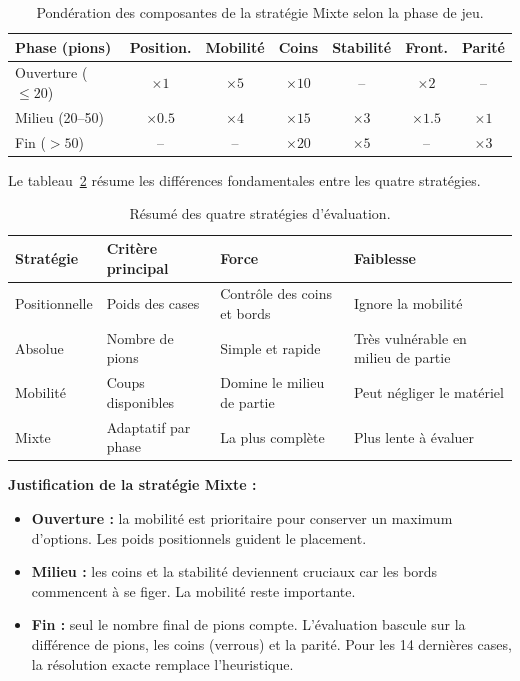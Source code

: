 \documentclass[12pt, a4paper]{article}
\begin{document}
\begin{table}[H]
\centering
\caption{Pondération des composantes de la stratégie Mixte selon la phase de jeu.}
\label{tab:phases}
\begin{tabular}{@{} l c c c c c c @{}}
\toprule
\textbf{Phase (pions)} & \textbf{Position.} & \textbf{Mobilité} & \textbf{Coins} & \textbf{Stabilité} & \textbf{Front.} & \textbf{Parité} \\
\midrule
Ouverture ($\leq 20$)  & $\times 1$   & $\times 5$   & $\times 10$  & --           & $\times 2$   & -- \\
Milieu (20--50)         & $\times 0.5$ & $\times 4$   & $\times 15$  & $\times 3$   & $\times 1.5$ & $\times 1$ \\
Fin ($> 50$)            & --           & --            & $\times 20$  & $\times 5$   & --            & $\times 3$ \\
\bottomrule
\end{tabular}
\end{table}

Le tableau~\ref{tab:strategies_resume} résume les différences fondamentales entre les quatre stratégies.

\begin{table}[H]
\centering
\caption{Résumé des quatre stratégies d'évaluation.}
\label{tab:strategies_resume}
\begin{tabular}{@{} l p{3.5cm} p{3.5cm} p{3.5cm} @{}}
\toprule
\textbf{Stratégie} & \textbf{Critère principal} & \textbf{Force} & \textbf{Faiblesse} \\
\midrule
Positionnelle & Poids des cases & Contrôle des coins et bords & Ignore la mobilité \\
Absolue & Nombre de pions & Simple et rapide & Très vulnérable en milieu de partie \\
Mobilité & Coups disponibles & Domine le milieu de partie & Peut négliger le matériel \\
Mixte & Adaptatif par phase & La plus complète & Plus lente à évaluer \\
\bottomrule
\end{tabular}
\end{table}

\textbf{Justification de la stratégie Mixte :}
\begin{itemize}
    \item \textbf{Ouverture :} la mobilité est prioritaire pour conserver un maximum d'options. Les poids positionnels guident le placement.
    \item \textbf{Milieu :} les coins et la stabilité deviennent cruciaux car les bords commencent à se figer. La mobilité reste importante.
    \item \textbf{Fin :} seul le nombre final de pions compte. L'évaluation bascule sur la différence de pions, les coins (verrous) et la parité. Pour les 14 dernières cases, la résolution exacte remplace l'heuristique.
\end{itemize}
\end{document}
